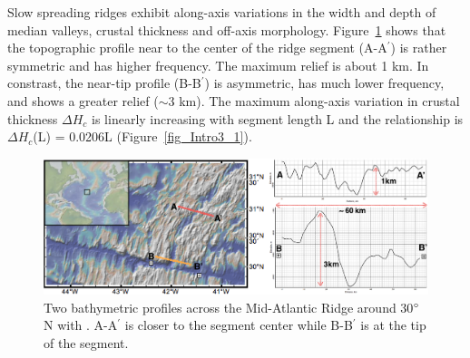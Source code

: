%
Slow spreading ridges exhibit along-axis variations in the width and depth of median valleys, crustal thickness and off-axis morphology.  Figure~\ref{fig_Intro2_1} shows that the topographic profile near to the center of the ridge segment (A-A$^{\prime}$) is rather symmetric and has higher frequency. The maximum relief is about 1 km. In constrast, the near-tip profile (B-B$^{\prime}$) is asymmetric, has much lower frequency, and shows a greater relief ($\sim$3 km). 
The maximum along-axis variation in crustal thickness $\Delta H_{c}$ is linearly increasing with segment length L \citep{Chen1999} and the relationship is $\Delta H_{c}$(L) = 0.0206L (Figure~\ref{fig_Intro3_1}). 

\begin{figure}[H]
 \centering
  \includegraphics[scale=0.4]{./Figures/fig_Intro2_1.png}
 \caption{\small{Two bathymetric profiles across the Mid-Atlantic Ridge around 30$\degree$N with
 . A-A$^{\prime}$ is closer to the segment center while B-B$^{\prime}$ is at the tip of the segment. }
 }
 
 \label{fig_Intro2_1}
\end{figure}

